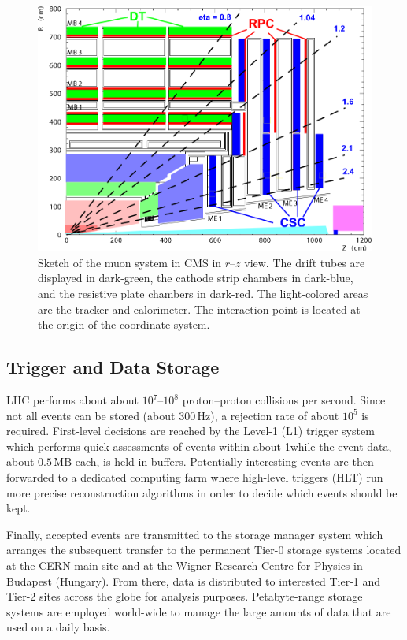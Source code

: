 \begin{figure}
	\includegraphics[width=\textwidth]{Detector/muon}
	\centering
	\caption{Sketch of the muon system in CMS in $r$--$z$ view. The drift tubes are displayed in dark-green, the cathode strip chambers in dark-blue, and the resistive plate chambers in dark-red. The light-colored areas are the tracker and calorimeter. The interaction point is located at the origin of the coordinate system.}
	\label{fig:muonSystem}
\end{figure}

\subsection{Trigger and Data Storage}
LHC performs about about $10^7$--$10^8$ proton--proton collisions per second. Since not all events can be stored (about $300\,\text{Hz}$), a rejection rate of about $10^5$ is required. First-level decisions are reached by the Level-1 (L1) trigger system which performs quick assessments of events within about 1\mus while the event data, about $0.5\,\text{MB}$ each, is held in buffers. Potentially interesting events are then forwarded to a dedicated computing farm where high-level triggers (HLT) run more precise reconstruction algorithms in order to decide which events should be kept.

Finally, accepted events are transmitted to the storage manager system which arranges the subsequent transfer to the permanent Tier-0 storage systems located at the CERN main site and at the Wigner Research Centre for Physics in Budapest (Hungary). From there, data is distributed to interested Tier-1 and Tier-2 sites across the globe for analysis purposes. Petabyte-range storage systems are employed world-wide to manage the large amounts of data that are used on a daily basis.
